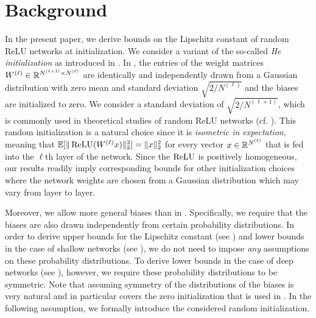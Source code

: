 
\section{Background}\label{sec:Background}

In the present paper, we derive bounds on the Lipschitz constant of random ReLU networks at initialization.
We consider a variant of the so-called \emph{He initialization} as introduced in \cite{he2015delving}.
In \cite{he2015delving}, the entries of the weight matrices $W^{(\ell)} \in \mathbb{R}^{N^{(\ell + 1)} \times N^{(\ell)}}$ are identically and independently drawn from a Gaussian distribution
with zero mean and standard deviation $\sqrt{2/N^{(\ell)}}$
and the biases are initialized to zero.
We consider a standard deviation of $\sqrt{2/N^{(\ell+1)}}$, which is commonly used in theoretical studies of random ReLU networks (cf. \cite{buchanan2021deep,allen2019convergence,dirksen2022separation}).
This random initialization is a natural choice since it is \emph{isometric in expectation}, 
meaning that $\mathbb{E} [\Vert \operatorname{ReLU}(W^{(\ell)}x)\Vert_2^2] = \Vert x \Vert_2^2$ 
for every vector $x \in \mathbb{R}^{N^{(\ell)}}$ that is fed into the $\ell$th layer of the network.
Since the $\operatorname{ReLU}$ is positively homogeneous, our results readily imply corresponding bounds for other initialization choices where the network weights are chosen from a Gaussian distribution which may vary from layer to layer.

Moreover, we allow more general biases than in \cite{he2015delving}.
Specifically, we require that the biases are also drawn independently from certain probability distributions.
In order to derive upper bounds for the Lipschitz constant (see ) 
and lower bounds in the case of shallow networks (see ),
we do not need to impose \emph{any} assumptions on these probability distributions.
To derive lower bounds in the case of deep networks (see ), however,
we require these probability distributions to be symmetric.
Note that assuming symmetry of the distributions of the biases is very natural and in particular covers
the zero initialization that is used in \cite{he2015delving}.
In the following assumption, we formally introduce the considered random initialization.

